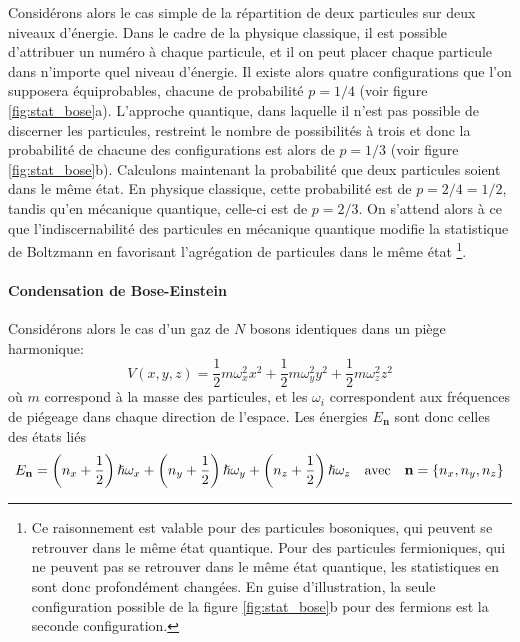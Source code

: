 Considérons alors le cas simple de la répartition de deux particules sur deux niveaux d'énergie. Dans le cadre de la physique classique, il est possible d'attribuer un numéro à chaque particule, et il on peut placer chaque particule dans n'importe quel niveau d'énergie. Il existe alors quatre configurations que l'on supposera équiprobables, chacune de probabilité $p=1/4$ (voir figure \ref{fig:stat_bose}a). L'approche quantique, dans laquelle il n'est pas possible de discerner les particules, restreint le nombre de possibilités à trois et donc la probabilité de chacune des configurations est alors de $p=1/3$ (voir figure \ref{fig:stat_bose}b). Calculons maintenant la probabilité que deux particules soient dans le même état. En physique classique, cette probabilité est de $p=2/4=1/2$, tandis qu'en mécanique quantique, celle-ci est de $p=2/3$. On s'attend alors à ce que l'indiscernabilité des particules en mécanique quantique modifie la statistique de Boltzmann en favorisant l'agrégation de particules dans le même état \footnote{Ce raisonnement est valable pour des particules bosoniques, qui peuvent se retrouver dans le même état quantique. Pour des particules fermioniques, qui ne peuvent pas se retrouver dans le même état quantique, les statistiques en sont donc profondément changées. En guise d'illustration, la seule configuration possible de la figure \ref{fig:stat_bose}b pour des fermions est la seconde configuration.}.

\paragraph*{Condensation de Bose-Einstein}
Considérons alors le cas d'un gaz de $N$ bosons identiques dans un piège harmonique:
\begin{equation}
V(x,y,z)=\frac{1}{2}m \omega_x^2 x^2 + \frac{1}{2}m \omega_y^2 y^2 + \frac{1}{2}m \omega_z^2 z^2
\label{eq:piege_harmonique}
\end{equation}
où $m$ correspond à la masse des particules, et les $\omega_i$ correspondent aux fréquences de piégeage dans chaque direction de l'espace. Les énergies $E_{\mathbf{n}}$ sont donc celles des états liés
\begin{equation}
E_{\mathbf{n}}=\left(n_x+\frac{1}{2}\right) \hslash \omega_x + \left(n_y+\frac{1}{2}\right) \hslash \omega_y + \left(n_z+\frac{1}{2}\right) \hslash \omega_z \quad \text{avec}\quad \mathbf{n}=\lbrace n_x,n_y,n_z\rbrace
\end{equation}

